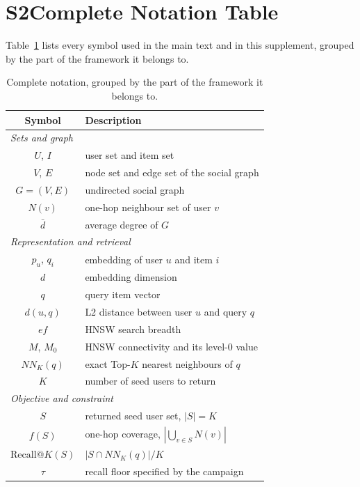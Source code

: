 \documentclass[conference]{IEEEtran}
\begin{document}
\section*{S2\quad Complete Notation Table}
\label{sec:s2}
Table~\ref{tab:s2} lists every symbol used in the main text and in this
supplement, grouped by the part of the framework it belongs to.

\begin{table}[h]
\caption{Complete notation, grouped by the part of the framework it belongs to.}
\label{tab:s2}
\begin{center}
\small
\setlength{\tabcolsep}{4pt}
\begin{tabular}{|c|l|}
\hline
\textbf{Symbol} & \textbf{Description} \\
\hline
\multicolumn{2}{|l|}{\textit{Sets and graph}} \\
\hline
$U$, $I$ & user set and item set \\
$V$, $E$ & node set and edge set of the social graph \\
$G=(V,E)$ & undirected social graph \\
$N(v)$ & one-hop neighbour set of user $v$ \\
$\bar{d}$ & average degree of $G$ \\
\hline
\multicolumn{2}{|l|}{\textit{Representation and retrieval}} \\
\hline
$p_u$, $q_i$ & embedding of user $u$ and item $i$ \\
$d$ & embedding dimension \\
$q$ & query item vector \\
$d(u,q)$ & L2 distance between user $u$ and query $q$ \\
$\mathit{ef}$ & HNSW search breadth \\
$M$, $M_0$ & HNSW connectivity and its level-0 value \\
$NN_K(q)$ & exact Top-$K$ nearest neighbours of $q$ \\
$K$ & number of seed users to return \\
\hline
\multicolumn{2}{|l|}{\textit{Objective and constraint}} \\
\hline
$S$ & returned seed user set, $|S|=K$ \\
$f(S)$ & one-hop coverage, $|\bigcup_{v\in S}N(v)|$ \\
$\text{Recall@}K(S)$ & $|S\cap NN_K(q)|/K$ \\
$\tau$ & recall floor specified by the campaign \\

\end{tabular}
\end{center}
\end{table}
\end{document}
